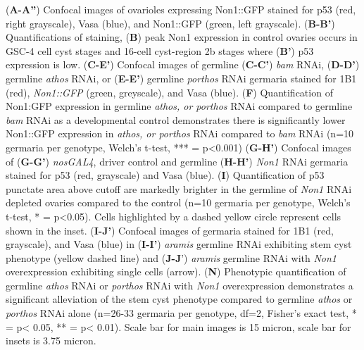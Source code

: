 \documentclass[12pt,oneside]{reedthesis}
\begin{document}
(\textbf{A-A''}) Confocal images of ovarioles expressing
Non1::GFP stained for p53 (red, right grayscale), Vasa (blue), and
Non1::GFP (green, left grayscale). (\textbf{B-B'}) Quantifications of
staining, (\textbf{B}) peak Non1 expression in control ovaries occurs in
GSC-4 cell cyst stages and 16-cell cyst-region 2b stages where (\textbf{B'})
p53 expression is low. (\textbf{C-E'}) Confocal images of germline (\textbf{C-C'})
\emph{bam} RNAi, (\textbf{D-D'}) germline \emph{athos} RNAi, or (\textbf{E-E'}) germline
\emph{porthos} RNAi germaria stained for 1B1 (red), \emph{Non1::GFP} (green,
greyscale), and Vasa (blue). (\textbf{F}) Quantification of Non1:GFP
expression in germline \emph{athos, or porthos} RNAi compared to germline
\emph{bam} RNAi as a developmental control demonstrates there is
significantly lower Non1::GFP expression in \emph{athos, or porthos} RNAi
compared to \emph{bam} RNAi (n=10 germaria per genotype, Welch's t-test,
*** = p\textless0.001) (\textbf{G-H'}) Confocal images of (\textbf{G-G'}) \emph{nosGAL4},
driver control and germline (\textbf{H-H'}) \emph{Non1} RNAi germaria stained for
p53 (red, grayscale) and Vasa (blue). (\textbf{I}) Quantification of p53
punctate area above cutoff are markedly brighter in the germline of
\emph{Non1} RNAi depleted ovaries compared to the control (n=10 germaria per
genotype, Welch's t-test, * = p\textless0.05). Cells highlighted by a dashed
yellow circle represent cells shown in the inset. (\textbf{I-J'}) Confocal
images of germaria stained for 1B1 (red, grayscale), and Vasa (blue) in
(\textbf{I-I'}) \emph{aramis} germline RNAi exhibiting stem cyst phenotype (yellow
dashed line) and (\textbf{J-J}') \emph{aramis} germline RNAi with \emph{Non1}
overexpression exhibiting single cells (arrow). (\textbf{N}) Phenotypic
quantification of germline \emph{athos} RNAi or \emph{porthos} RNAi with \emph{Non1}
overexpression demonstrates a significant alleviation of the stem cyst
phenotype compared to germline \emph{athos} or \emph{porthos} RNAi alone (n=26-33
germaria per genotype, df=2, Fisher's exact test, * = p\textless{} 0.05, ** =
p\textless{} 0.01). Scale bar for main images is 15 micron, scale bar for insets
is 3.75 micron.

\textbf{\hfill\break
}
\end{document}
